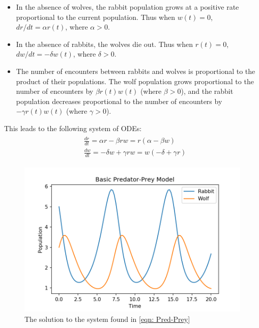 \begin{itemize}
\item In the absence of wolves, the rabbit population grows at a positive rate proportional to the current population. Thus when $w(t) = 0$, $dr/dt = \alpha r(t)$, where $\alpha > 0$.
\item In the absence of rabbits, the wolves die out. Thus when $r(t) = 0$, $dw/dt = -\delta w(t)$, where $\delta > 0$.
\item The number of encounters between rabbits and wolves is proportional to the product of their populations. The wolf population grows proportional to the number of encounters by $\beta r(t)w(t)$ (where $\beta > 0$), and the rabbit population decreases proportional to the number of encounters by $-\gamma r(t)w(t)$ (where $\gamma > 0$). 
\end{itemize}

This leads to the following system of ODEs: 
\begin{align}
	\begin{split}
	&\frac{dr}{dt} = \alpha r - \beta r w = r(\alpha - \beta w)\\
	&\frac{dw}{dt} = -\delta w + \gamma r w = w(-\delta + \gamma r)
	\end{split}\label{eqn: Pred-Prey}
\end{align}

\begin{figure}
\centering
\includegraphics[width=\textwidth]{figures/Predator_Prey.png}
\caption{The solution to the system found in \eqref{eqn: Pred-Prey}}
\label{fig: Pred-Prey}
\end{figure}




